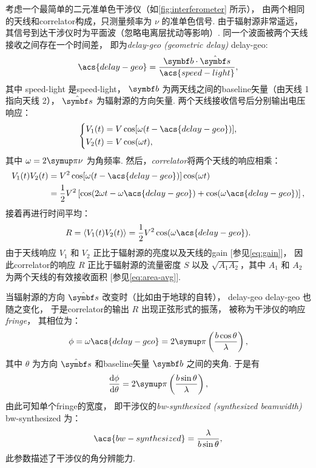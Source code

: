 考虑一个最简单的二元准单色干涉仪（如\autoref{fig:interferometer} 所示），
由两个相同的天线和\ac{correlator}构成，只测量频率为 $\nu$ 的准单色信号.
由于辐射源非常遥远，其信号到达干涉仪时为平面波（忽略电离层扰动等影响）.
同一个波面被两个天线接收之间存在一个时间差，
即为\emph{\acl{delay-geo} (geometric delay)} \ac{delay-geo}:
\begin{equation}
  \acs{delay-geo} = \frac{\B{b} \cdot \hat{\B{s}}}{\acs{speed-light}},
\end{equation}
其中 \acs{speed-light} 是\acl{speed-light}，
$\B{b}$ 为两天线之间的\ac{baseline}矢量（由天线 1 指向天线 2），
$\hat{\B{s}}$ 为辐射源的方向矢量.
两个天线接收信号后分别输出电压响应：
\begin{equation}
  \left\{
    \begin{aligned}
      V_1(t) &= V \cos [\omega (t - \acs{delay-geo})], \\
      V_2(t) &= V \cos (\omega t),
    \end{aligned}
  \right.
\end{equation}
其中 $\omega = 2\Cpi\nu$ 为角频率.
然后，\emph{\ac{correlator}}将两个天线的响应相乘：
\begin{align}
  V_1(t) V_2(t)
    &= V^2 \cos [\omega (t - \acs{delay-geo})] \cos (\omega t) \\
    &= \frac{1}{2} V^2 \left[ \cos (2\omega t - \omega \acs{delay-geo})
      + \cos (\omega \acs{delay-geo}) \right] ,
\end{align}
接着再进行时间平均：
\begin{equation}
  \label{eq:resp-corr}
  R = \langle V_1(t) V_2(t) \rangle
    = \frac{1}{2} V^2 \cos (\omega \acs{delay-geo}).
\end{equation}
由于天线响应 $V_1$ 和 $V_2$ 正比于辐射源的亮度以及天线的\ac{gain}
[参见\autoref{eq:gain}]，
因此\ac{correlator}的响应 $R$ 正比于辐射源的流量密度 $S$
以及 $\sqrt{A_1 A_2}$，其中 $A_1$ 和 $A_2$ 为两个天线的有效接收面积
[参见\autoref{eq:area-avg}].

当辐射源的方向 $\hat{\B{s}}$ 改变时（比如由于地球的自转），
\acl{delay-geo} \acs{delay-geo} 也随之变化，
于是\ac{correlator}的输出 $R$ 出现正弦形式的振荡，
被称为干涉仪的响应\emph{\acf{fringe}}，
其相位为：
\begin{equation}
  \phi = \omega \acs{delay-geo}
    = 2\Cpi \left( \frac{b \cos\theta}{\lambda} \right),
\end{equation}
其中 $\theta$ 为方向 $\hat{\B{s}}$ 和\ac{baseline}矢量 $\B{b}$ 之间的夹角.
于是有
\begin{equation}
  \diff{\phi}{\theta} = 2\Cpi \left( \frac{b \sin\theta}{\lambda} \right),
\end{equation}
由此可知单个\ac{fringe}的宽度，
即干涉仪的\emph{\acl{bw-synthesized} (synthesized beamwidth)}
\acs{bw-synthesized} 为：
\begin{equation}
  \label{eq:bw-synthesized}
  \acs{bw-synthesized} = \frac{\lambda}{b \sin\theta},
\end{equation}
此参数描述了干涉仪的角分辨能力.

